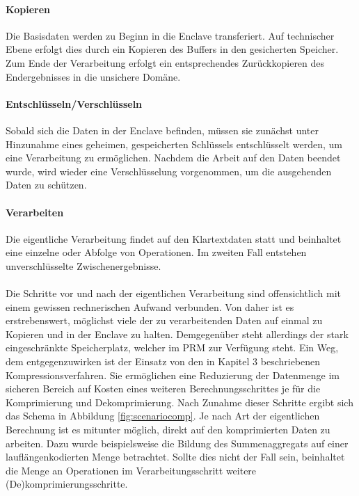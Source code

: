 \paragraph{Kopieren}
Die Basisdaten werden zu Beginn in die Enclave transferiert. Auf technischer Ebene erfolgt dies durch ein Kopieren des Buffers in den gesicherten Speicher. Zum Ende der Verarbeitung erfolgt ein entsprechendes Zurückkopieren des Endergebnisses in die unsichere Domäne.

\paragraph{Entschlüsseln/Verschlüsseln}
Sobald sich die Daten in der Enclave befinden, müssen sie zunächst unter Hinzunahme eines geheimen, gespeicherten Schlüssels entschlüsselt werden, um eine Verarbeitung zu ermöglichen. Nachdem die Arbeit auf den Daten beendet wurde, wird wieder eine Verschlüsselung vorgenommen, um die ausgehenden Daten zu schützen.

\paragraph{Verarbeiten}
Die eigentliche Verarbeitung findet auf den Klartextdaten statt und beinhaltet eine einzelne oder Abfolge von Operationen. Im zweiten Fall entstehen unverschlüsselte Zwischenergebnisse.

\paragraph{}
Die Schritte vor und nach der eigentlichen Verarbeitung sind offensichtlich mit einem gewissen rechnerischen Aufwand verbunden. Von daher ist es erstrebenswert, möglichst viele der zu verarbeitenden Daten auf einmal zu Kopieren und in der Enclave zu halten. Demgegenüber steht allerdings der stark eingeschränkte Speicherplatz, welcher im \ac{PRM} zur Verfügung steht. Ein Weg, dem entgegenzuwirken ist der Einsatz von den in Kapitel 3 beschriebenen Kompressionsverfahren. Sie ermöglichen eine Reduzierung der Datenmenge im sicheren Bereich auf Kosten eines weiteren Berechnungsschrittes je für die Komprimierung und Dekomprimierung. Nach Zunahme dieser Schritte ergibt sich das Schema in Abbildung \ref{fig:scenariocomp}. Je nach Art der eigentlichen Berechnung ist es mitunter möglich, direkt auf den komprimierten Daten zu arbeiten. Dazu wurde beispielsweise die Bildung des Summenaggregats auf einer lauflängenkodierten Menge betrachtet. Sollte dies nicht der Fall sein, beinhaltet die Menge an Operationen im Verarbeitungsschritt weitere (De)komprimierungsschritte.

